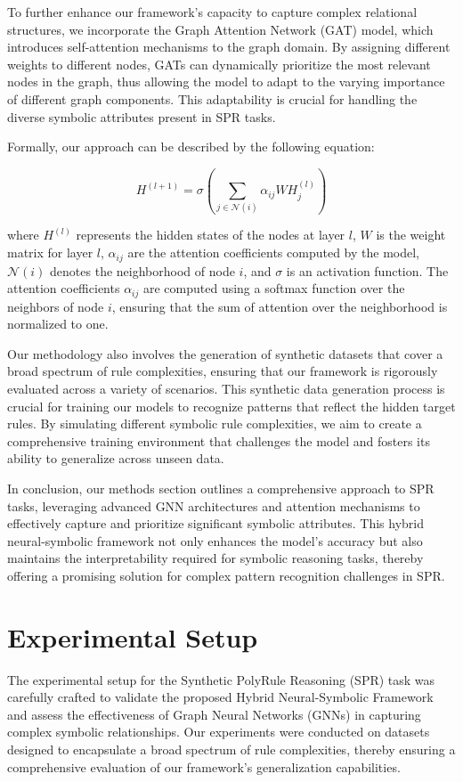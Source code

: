 \documentclass{article}
\begin{document}
To further enhance our framework's capacity to capture complex relational structures, we incorporate the Graph Attention Network (GAT) model, which introduces self-attention mechanisms to the graph domain. By assigning different weights to different nodes, GATs can dynamically prioritize the most relevant nodes in the graph, thus allowing the model to adapt to the varying importance of different graph components. This adaptability is crucial for handling the diverse symbolic attributes present in SPR tasks.

Formally, our approach can be described by the following equation:

\[
H^{(l+1)} = \sigma \left( \sum_{j \in \mathcal{N}(i)} \alpha_{ij} W H^{(l)}_j \right)
\]

where \(H^{(l)}\) represents the hidden states of the nodes at layer \(l\), \(W\) is the weight matrix for layer \(l\), \(\alpha_{ij}\) are the attention coefficients computed by the model, \(\mathcal{N}(i)\) denotes the neighborhood of node \(i\), and \(\sigma\) is an activation function. The attention coefficients \(\alpha_{ij}\) are computed using a softmax function over the neighbors of node \(i\), ensuring that the sum of attention over the neighborhood is normalized to one.

Our methodology also involves the generation of synthetic datasets that cover a broad spectrum of rule complexities, ensuring that our framework is rigorously evaluated across a variety of scenarios. This synthetic data generation process is crucial for training our models to recognize patterns that reflect the hidden target rules. By simulating different symbolic rule complexities, we aim to create a comprehensive training environment that challenges the model and fosters its ability to generalize across unseen data.

In conclusion, our methods section outlines a comprehensive approach to SPR tasks, leveraging advanced GNN architectures and attention mechanisms to effectively capture and prioritize significant symbolic attributes. This hybrid neural-symbolic framework not only enhances the model's accuracy but also maintains the interpretability required for symbolic reasoning tasks, thereby offering a promising solution for complex pattern recognition challenges in SPR.

\section{Experimental Setup}
The experimental setup for the Synthetic PolyRule Reasoning (SPR) task was carefully crafted to validate the proposed Hybrid Neural-Symbolic Framework and assess the effectiveness of Graph Neural Networks (GNNs) in capturing complex symbolic relationships. Our experiments were conducted on datasets designed to encapsulate a broad spectrum of rule complexities, thereby ensuring a comprehensive evaluation of our framework's generalization capabilities.
\end{document}
